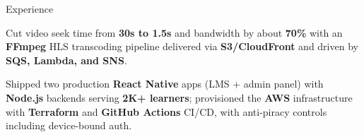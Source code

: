 \documentclass{resume}
\begin{document}
\begin{rSection}{Experience}
\begin{jobitems}
    \item Cut video seek time from \textbf{30s to 1.5s} and bandwidth by about \textbf{70\%} with an \textbf{FFmpeg} HLS transcoding pipeline delivered via \textbf{S3/CloudFront} and driven by \textbf{SQS, Lambda, and SNS}.
    \item Shipped two production \textbf{React Native} apps (LMS + admin panel) with \textbf{Node.js} backends serving \textbf{2K+ learners}; provisioned the \textbf{AWS} infrastructure with \textbf{Terraform} and \textbf{GitHub Actions} CI/CD, with anti-piracy controls including device-bound auth.
\end{jobitems}

\end{rSection}\vspace{-0.7em}
\end{document}
